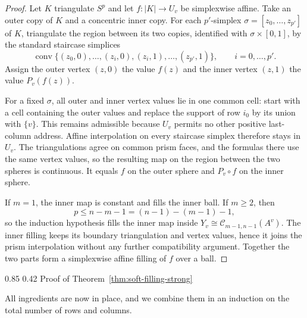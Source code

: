 \documentclass[11pt,reqno]{amsart}
\makeatletter
\numberwithin{equation}{section}
\renewcommand\subsection{\@startsection{subsection}{2}{\z@}%
  {0.85\baselineskip \@plus 0.25\baselineskip \@minus 0.10\baselineskip}%
  {0.42\baselineskip}%
  {\normalfont\bfseries}}
\theoremstyle{definition}
\theoremstyle{remark}
\makeatother
\begin{document}
\begin{proof}
Let $K$ triangulate $S^p$ and let $f:|K|\to U_v$ be simplexwise affine.
Take an outer copy of $K$ and a concentric inner copy.  For each
$p'$-simplex $\sigma=[z_0,\ldots,z_{p'}]$ of $K$, triangulate the region
between its two copies, identified with $\sigma\times[0,1]$, by the standard
staircase simplices
\[
 \operatorname{conv}\{(z_0,0),\ldots,(z_i,0),
                      (z_i,1),\ldots,(z_{p'},1)\},
 \qquad i=0,\ldots,p'.
\]
Assign the outer vertex $(z,0)$ the value $f(z)$ and the inner vertex
$(z,1)$ the value $P_v(f(z))$.

For a fixed $\sigma$, all outer and inner vertex values lie in one common
cell: start with a cell containing the outer values and replace the support
of row $i_0$ by its union with $\{v\}$.  This remains admissible because $U_v$ permits no
other positive last-column address.  Affine interpolation on every staircase
simplex therefore stays in $U_v$.  The triangulations agree on common prism
faces, and the formulas there use the same vertex values, so the resulting
map on the region between the two spheres is continuous.  It equals $f$ on
the outer sphere and $P_v\circ f$ on the inner sphere.

If $m=1$, the inner map is constant and fills the inner ball.  If $m\ge2$,
then
\[
 p\le n-m-1=(n-1)-(m-1)-1,
\]
so the induction hypothesis fills the inner map inside
$Y_v\cong\mathcal C_{m-1,n-1}(A^v)$.  The inner filling keeps its boundary
triangulation and vertex values, hence it joins the prism interpolation
without any further compatibility argument.  Together the two parts form a
simplexwise affine filling of $f$ over a ball.
\end{proof}

\subsection{Proof of Theorem~\ref{thm:soft-filling-strong}}

All ingredients are now in place, and we combine them in an induction on the total
number of rows and columns.
\end{document}
